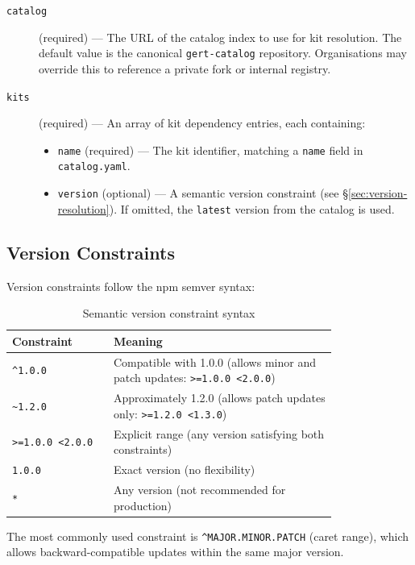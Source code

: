 \begin{description}
  \item[\texttt{catalog}] (required) — The URL of the catalog index to use for kit resolution. The default value is the canonical \texttt{gert-catalog} repository. Organisations may override this to reference a private fork or internal registry.

  \item[\texttt{kits}] (required) — An array of kit dependency entries, each containing:
  \begin{itemize}
    \item \texttt{name} (required) — The kit identifier, matching a \texttt{name} field in \texttt{catalog.yaml}.
    \item \texttt{version} (optional) — A semantic version constraint (see \S\ref{sec:version-resolution}). If omitted, the \texttt{latest} version from the catalog is used.
  \end{itemize}
\end{description}

\subsection{Version Constraints}

Version constraints follow the npm semver syntax:

\begin{table}[ht]
\centering
\caption{Semantic version constraint syntax}
\label{tab:semver-constraints}
\small
\begin{tabular}{p{0.25\linewidth}p{0.55\linewidth}}
\toprule
\textbf{Constraint} & \textbf{Meaning} \\
\midrule
\texttt{\^{}1.0.0} & Compatible with 1.0.0 (allows minor and patch updates: \texttt{>=1.0.0 <2.0.0}) \\
\texttt{\~{}1.2.0} & Approximately 1.2.0 (allows patch updates only: \texttt{>=1.2.0 <1.3.0}) \\
\texttt{>=1.0.0 <2.0.0} & Explicit range (any version satisfying both constraints) \\
\texttt{1.0.0} & Exact version (no flexibility) \\
\texttt{*} & Any version (not recommended for production) \\
\bottomrule
\end{tabular}
\end{table}

The most commonly used constraint is \texttt{\^{}MAJOR.MINOR.PATCH} (caret range), which allows backward-compatible updates within the same major version.

